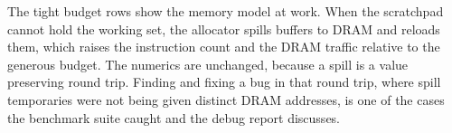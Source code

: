 The tight budget rows show the memory model at work. When the scratchpad cannot
hold the working set, the allocator spills buffers to DRAM and reloads them, which
raises the instruction count and the DRAM traffic relative to the generous budget.
The numerics are unchanged, because a spill is a value preserving round trip.
Finding and fixing a bug in that round trip, where spill temporaries were not
being given distinct DRAM addresses, is one of the cases the benchmark suite
caught and the debug report discusses.
